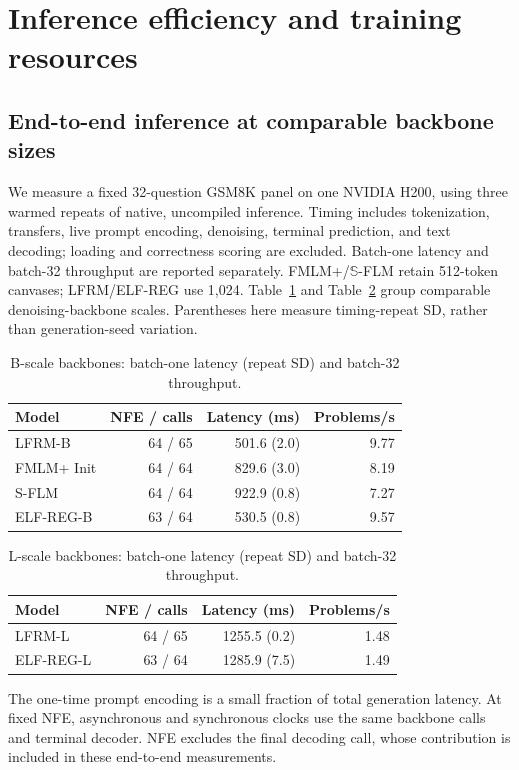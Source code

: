 \documentclass{article}
\newenvironment{revision}{\begingroup\color{blue}}{\endgroup}
\begin{document}
\clearpage
\begin{revision}
\section{Inference efficiency and training resources}
\label{app:efficiency}
\subsection{End-to-end inference at comparable backbone sizes}
We measure a fixed 32-question GSM8K panel on one NVIDIA H200, using three warmed repeats of native, uncompiled inference. Timing includes tokenization, transfers, live prompt encoding, denoising, terminal prediction, and text decoding; loading and correctness scoring are excluded. Batch-one latency and batch-32 throughput are reported separately. FMLM+/$\mathbb S$-FLM retain 512-token canvases; LFRM/ELF-REG use 1,024. Table~\ref{tab:latencyb} and Table~\ref{tab:latencyl} group comparable denoising-backbone scales. Parentheses here measure timing-repeat SD, rather than generation-seed variation.
\begin{table}[htbp]\color{blue}\centering\small
\caption{B-scale backbones: batch-one latency (repeat SD) and batch-32 throughput.}
\label{tab:latencyb}
\begin{tabular}{@{}lrrr@{}}\toprule
Model & NFE / calls & Latency (ms) & Problems/s\\\midrule
LFRM-B & 64 / 65 & 501.6 (2.0) & 9.77\\
FMLM+ Init & 64 / 64 & 829.6 (3.0) & 8.19\\
S-FLM & 64 / 64 & 922.9 (0.8) & 7.27\\
ELF-REG-B & 63 / 64 & 530.5 (0.8) & 9.57\\
\bottomrule\end{tabular}
\end{table}
\begin{table}[htbp]\color{blue}\centering\small
\caption{L-scale backbones: batch-one latency (repeat SD) and batch-32 throughput.}
\label{tab:latencyl}
\begin{tabular}{@{}lrrr@{}}\toprule
Model & NFE / calls & Latency (ms) & Problems/s\\\midrule
LFRM-L & 64 / 65 & 1255.5 (0.2) & 1.48\\
ELF-REG-L & 63 / 64 & 1285.9 (7.5) & 1.49\\
\bottomrule\end{tabular}
\end{table}
The one-time prompt encoding is a small fraction of total generation latency. At fixed NFE, asynchronous and synchronous clocks use the same backbone calls and terminal decoder. NFE excludes the final decoding call, whose contribution is included in these end-to-end measurements.



\end{revision}
\end{document}
